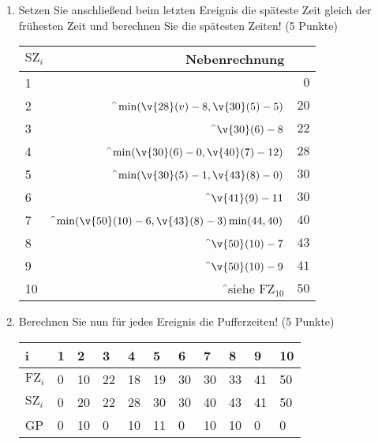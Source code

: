 \documentclass{lehramt-informatik}
\begin{document}
\begin{enumerate}

\item Setzen Sie anschließend beim letzten Ereignis die späteste Zeit
gleich der frühesten Zeit und berechnen Sie die spätesten Zeiten! (5
Punkte)

\begin{antwort}
\begin{tabular}{|l|r|r|}
\hline
$\text{SZ}_i$ & Nebenrechnung & \\\hline\hline
1 & & $0$ \\\hline
2 & \f$\min(\v{28}(v) - 8, \v{30}(5) - 5)$               & $20$ \\\hline
3 & \f$\v{30}(6) - 8$                                    & $22$ \\\hline
4 & \f$\min(\v{30}(6) - 0, \v{40}(7) - 12)$              & $28$ \\\hline
5 & \f$\min(\v{30}(5) - 1, \v{43}(8) - 0)$               & $30$ \\\hline
6 & \f$\v{41}(9) - 11$                                   & $30$ \\\hline
7 & \f$\min(\v{50}(10) - 6, \v{43}(8) - 3) \min(44, 40)$ & $40$ \\\hline
8 & \f$\v{50}(10) - 7$                                   & $43$ \\\hline
9 & \f$\v{50}(10) - 9$                                   & $41$ \\\hline
10 & \f{}siehe $\text{FZ}_10$                            & $50$ \\\hline
\end{tabular}
\end{antwort}


\item Berechnen Sie nun für jedes Ereignis die Pufferzeiten! (5 Punkte)

\begin{antwort}
\begin{tabular}{|l|l|l|l|l|l|l|l|l|l|l|}
\hline
i             & 1 & 2  & 3   & 4  & 5  & 6  & 7  & 8  & 9  & 10 \\\hline\hline
$\text{FZ}_i$ & 0 & 10 & 22  & 18 & 19 & 30 & 30 & 33 & 41 & 50 \\\hline
$\text{SZ}_i$ & 0 & 20 & 22  & 28 & 30 & 30 & 40 & 43 & 41 & 50 \\\hline
GP            & 0 & 10 & 0   & 10 & 11 & 0  & 10 & 10 & 0  & 0 \\\hline
\end{tabular}
\end{antwort}


\end{enumerate}
\end{document}
